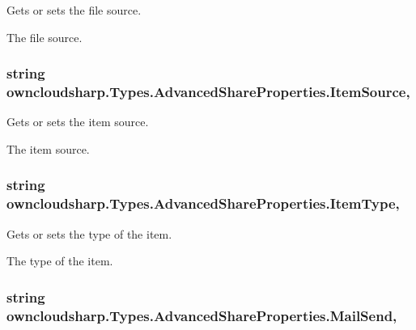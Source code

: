 Gets or sets the file source. 

The file source.\hypertarget{classowncloudsharp_1_1_types_1_1_advanced_share_properties_a6372a722cd53c858a4d4b4871ce7f14c}{}
\subsubsection[{Item\+Source}]{\setlength{\rightskip}{0pt plus 5cm}string owncloudsharp.\+Types.\+Advanced\+Share\+Properties.\+Item\+Source\hspace{0.3cm}{\ttfamily [get]}, {\ttfamily [set]}}\label{classowncloudsharp_1_1_types_1_1_advanced_share_properties_a6372a722cd53c858a4d4b4871ce7f14c}


Gets or sets the item source. 

The item source.\hypertarget{classowncloudsharp_1_1_types_1_1_advanced_share_properties_a27befd7724a4772825dc9f6c1edf43c1}{}
\subsubsection[{Item\+Type}]{\setlength{\rightskip}{0pt plus 5cm}string owncloudsharp.\+Types.\+Advanced\+Share\+Properties.\+Item\+Type\hspace{0.3cm}{\ttfamily [get]}, {\ttfamily [set]}}\label{classowncloudsharp_1_1_types_1_1_advanced_share_properties_a27befd7724a4772825dc9f6c1edf43c1}


Gets or sets the type of the item. 

The type of the item.\hypertarget{classowncloudsharp_1_1_types_1_1_advanced_share_properties_a73d194741812b8cc3c21dc22c620fd5f}{}
\subsubsection[{Mail\+Send}]{\setlength{\rightskip}{0pt plus 5cm}string owncloudsharp.\+Types.\+Advanced\+Share\+Properties.\+Mail\+Send\hspace{0.3cm}{\ttfamily [get]}, {\ttfamily [set]}}\label{classowncloudsharp_1_1_types_1_1_advanced_share_properties_a73d194741812b8cc3c21dc22c620fd5f}


